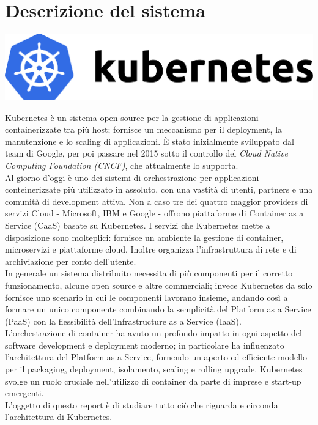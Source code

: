\documentclass[12pt, a4paper]{report}
\begin{document}
\section{Descrizione del sistema}
\begin{center}
  \includegraphics[scale = 0.9]{Images/kubernetesLogo}
\end{center}
Kubernetes è un sistema open source per la gestione di applicazioni containerizzate tra più host; fornisce un meccanismo per il deployment, la manutenzione e lo scaling di applicazioni. È stato inizialmente sviluppato dal team di Google, per poi passare nel 2015 sotto il controllo del \textit{Cloud Native Computing Foundation (CNCF)}, che attualmente lo supporta.\\ Al giorno d'oggi è uno dei sistemi di orchestrazione per applicazioni conteinerizzate più utilizzato in assoluto, con una vastità di utenti, partners e una comunità di development attiva. Non a caso tre dei quattro maggior providers di servizi Cloud - Microsoft, IBM e Google - offrono piattaforme di Container as a Service (CaaS) basate su Kubernetes. I servizi che Kubernetes mette a disposizione sono molteplici: fornisce un ambiente la gestione di container, microservizi e piattaforme cloud. Inoltre organizza l'infrastruttura di rete e di archiviazione per conto dell'utente.\\
In generale un sistema distribuito necessita di più componenti per il corretto funzionamento, alcune open source e altre commerciali; invece Kubernetes da solo fornisce uno scenario in cui le componenti lavorano insieme, andando così a formare un unico componente combinando la semplicità del Platform as a Service (PaaS) con la flessibilità dell'Infrastructure as a Service (IaaS).\\
L'orchestrazione di container ha avuto un profondo impatto in ogni aspetto del software development e deployment moderno; in particolare ha influenzato l'architettura del Platform as a Service, fornendo un aperto ed efficiente modello per il packaging, deployment, isolamento, scaling e rolling upgrade. Kubernetes svolge un ruolo cruciale nell'utilizzo di container da parte di imprese e start-up emergenti.
\\L'oggetto di questo report è di studiare tutto ciò che riguarda e circonda l'architettura di Kubernetes.
\end{document}
